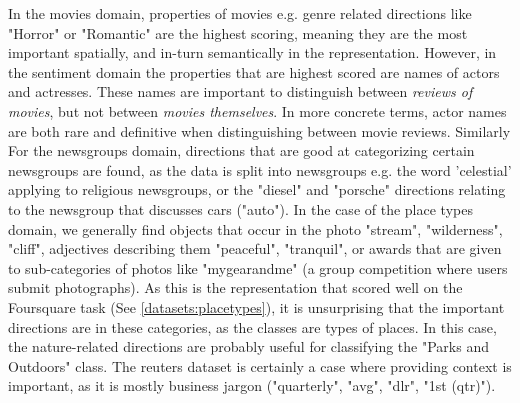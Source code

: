In the movies domain, properties of movies e.g. genre related directions like "Horror" or "Romantic" are the highest scoring, meaning they are the most important spatially, and in-turn semantically in the representation. However, in the sentiment domain the properties that are highest scored are names of actors and actresses. These names are  important to distinguish between \textit{reviews of movies}, but not between \textit{movies themselves}. In more concrete terms, actor names are both rare and definitive when distinguishing between movie reviews. Similarly For the newsgroups domain, directions  that are good at categorizing certain newsgroups are found, as the data is split into newsgroups e.g.  the word 'celestial' applying to religious newsgroups, or the "diesel" and "porsche" directions relating to the newsgroup that discusses cars ("auto"). In the case of the place types domain, we generally find objects that occur in the photo "stream", "wilderness", "cliff", adjectives describing them "peaceful", "tranquil", or  awards that are given to sub-categories of photos like "mygearandme" (a group competition where users submit photographs). As this is the representation that scored well on the Foursquare task (See \ref{datasets:placetypes}), it is unsurprising that the important directions are in these categories, as the classes are types of places. In this case, the nature-related directions are probably useful for classifying the "Parks and Outdoors" class. The reuters dataset is certainly a case where providing context is important, as it is mostly business jargon ("quarterly", "avg", "dlr", "1st (qtr)"). 

